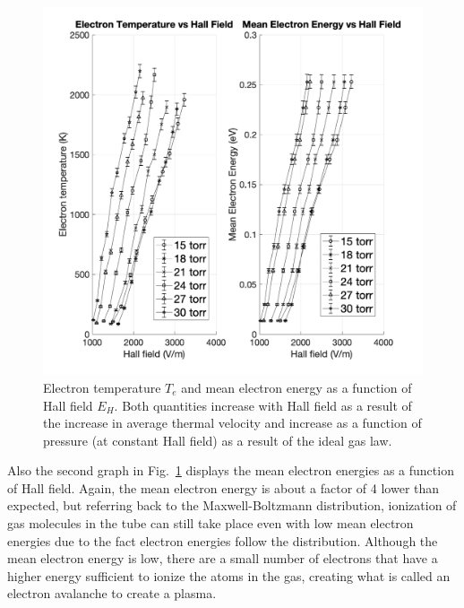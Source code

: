 \documentclass[%
 aip,
rsi,%
 amsmath,amssymb,
 reprint,%
author-numerical,%
]{revtex4-1}
\begin{document}
\begin{figure}
\includegraphics[width=0.8\linewidth]{lateximages/electrontemperature.png} 
\caption{\label{fig:electrontemperature} Electron temperature $T_{e}$ and mean electron energy as a function of Hall field ${E}  _ { H }$. Both quantities increase with Hall field as a result of the increase in average thermal velocity and increase as a function of pressure (at constant Hall field) as a result of the ideal gas law. }
\end{figure}

\indent Also the second graph in Fig.~\ref{fig:electrontemperature} displays the mean electron energies as a function of Hall field. Again, the mean electron energy is about a factor of 4 lower than expected, but referring back to the Maxwell-Boltzmann distribution, ionization of gas molecules in the tube can still take place even with low mean electron energies due to the fact electron energies follow the distribution. Although the mean electron energy is low, there are a small number of electrons that have a higher energy sufficient to ionize the atoms in the gas, creating what is called an electron avalanche to create a plasma.
\end{document}
